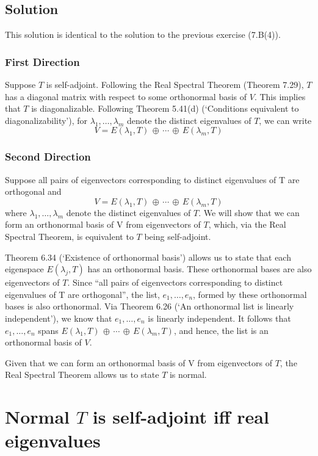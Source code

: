\documentclass{article}
\begin{document}
\subsection*{Solution}
This solution is identical to the solution to the previous exercise (7.B(4)).
\subsubsection*{First Direction}
Suppose $T$ is self-adjoint. Following the Real Spectral Theorem (Theorem 7.29), $T$ has a diagonal matrix with respect to some orthonormal basis of $V$. This implies that $T$ is diagonalizable. Following Theorem 5.41(d) (`Conditions equivalent to diagonalizability'), for $\lambda_1,\ldots,\lambda_m$ denote the distinct eigenvalues of $T$, we can write 
\[V=E(\lambda_1,T)\,\oplus\,\cdots\,\oplus\,E(\lambda_m,T)\]

\subsubsection*{Second Direction}
Suppose all pairs of eigenvectors corresponding to distinct eigenvalues of T are orthogonal and
\[V=E(\lambda_1,T)\,\oplus\,\cdots\,\oplus\,E(\lambda_m,T)\]
where $\lambda_1,\ldots,\lambda_m$ denote the distinct eigenvalues of $T$. We will show that we can form an orthonormal basis of V from eigenvectors of $T$, which, via the Real Spectral Theorem, is equivalent to $T$ being self-adjoint.

Theorem 6.34 (`Existence of orthonormal basis') allows us to state that each eigenspace $E(\lambda_j,T)$ has an orthonormal basis. These orthonormal bases are also eigenvectors of $T$. Since ``all pairs of eigenvectors corresponding to distinct eigenvalues of T are orthogonal'', the list, $e_1,\ldots,e_n$, formed by these orthonormal bases is also orthonormal. Via Theorem 6.26 (`An orthonormal list is linearly independent'), we know that $e_1,\ldots,e_n$ is linearly independent. It follows that $e_1,\ldots,e_n$ spans $E(\lambda_1,T)\,\oplus\,\cdots\,\oplus\,E(\lambda_m,T)$, and hence, the list is an orthonormal basis of $V$.

Given that we can form an orthonormal basis of V from eigenvectors of $T$, the Real Spectral Theorem allows us to state $T$ is normal.

\clearpage

\section{Normal $T$ is self-adjoint iff real eigenvalues}
\end{document}
